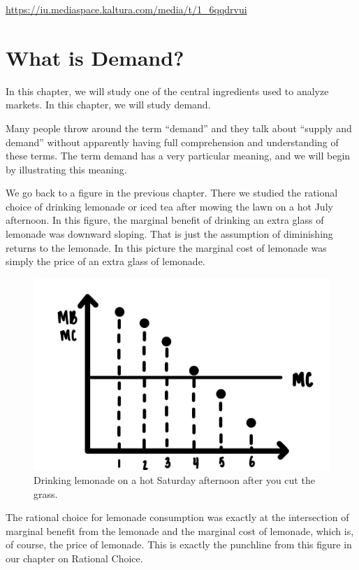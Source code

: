 \documentclass[
]{book}
\begin{document}
\url{https://iu.mediaspace.kaltura.com/media/t/1_6qqdrvui}

\hypertarget{what-is-demand}{%
\section{What is Demand?}\label{what-is-demand}}

In this chapter, we will study one of the central ingredients used to analyze markets. In this chapter, we will study demand.

Many people throw around the term ``demand'' and they talk about ``supply and demand'' without apparently having full comprehension and understanding of these terms. The term demand has a very particular meaning, and we will begin by illustrating this meaning.

We go back to a figure in the previous chapter. There we studied the rational choice of drinking lemonade or iced tea after mowing the lawn on a hot July afternoon. In this figure, the marginal benefit of drinking an extra glass of lemonade was downward sloping. That is just the assumption of diminishing returns to the lemonade. In this picture the marginal cost of lemonade was simply the price of an extra glass of lemonade.

\begin{figure}

{\centering \includegraphics[width=0.5\linewidth]{img/rationalchoice/fig6} 

}

\caption{Drinking lemonade on a hot Saturday afternoon after you cut the grass.}\label{fig:demand01}
\end{figure}

The rational choice for lemonade consumption was exactly at the intersection of marginal benefit from the lemonade and the marginal cost of lemonade, which is, of course, the price of lemonade. This is exactly the punchline from this figure in our chapter on Rational Choice.
\end{document}
